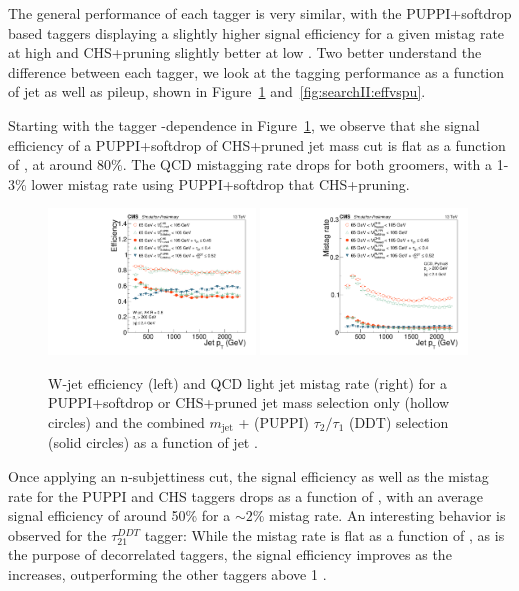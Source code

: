 The general performance of each tagger is very similar, with the PUPPI+softdrop based taggers displaying a slightly higher signal efficiency for a given mistag rate at high \PT and CHS+pruning slightly better at low \PT.
Two better understand the difference between each tagger, we look at the tagging performance as a function of jet \PT as well as pileup, shown in Figure~\ref{fig:searchII:effvspt} and~\ref{fig:searchII:effvspu}.\par
Starting with the tagger \PT-dependence in Figure~\ref{fig:searchII:effvspt}, we observe that she signal efficiency of a PUPPI+softdrop of CHS+pruned jet mass cut is flat as a function of \PT, at around 80\%. The QCD mistagging rate drops for both groomers, with a 1-3\% lower mistag rate using PUPPI+softdrop that CHS+pruning.
\begin{figure}[h!]
\centering
\includegraphics[width=0.49\textwidth]{figures/vtagging/JME-16-003/BoostedW/WtagSigEffvsPT.pdf}
\includegraphics[width=0.49\textwidth]{figures/vtagging/JME-16-003/BoostedW/QCDBkgEffvsPT.pdf}
\caption{W-jet efficiency (left) and QCD light jet mistag rate (right) for a PUPPI+softdrop or CHS+pruned jet mass selection only (hollow circles) and the combined $m_{\mathrm{jet}}$ + (PUPPI) $\tau_2/\tau_1$ (DDT) selection (solid circles) as a function of jet \PT.}
\label{fig:searchII:effvspt}
\end{figure}
Once applying an n-subjettiness cut, the signal efficiency as well as the mistag rate for the PUPPI \nsubj and CHS \nsubj taggers drops as a function of \PT, with an average signal efficiency of around 50\% for a $\sim 2\%$ mistag rate. An interesting behavior is observed for the $\tau_{21}^{DDT}$ tagger: While the mistag rate is flat as a function of \PT, as is the purpose of decorrelated taggers, the signal efficiency improves as the \PT increases, outperforming the other taggers above 1 \TeV. \par
